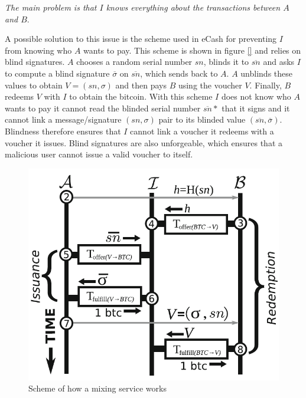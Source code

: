\emph{The main problem is that $I$ knows everything about the transactions between
$A$ and $B$}.

A possible solution to this issue is the scheme used in eCash for preventing $I$
from knowing who $A$ wants to pay. This scheme is shown in figure \ref{} and
relies on blind signatures. $A$ chooses a random serial number $sn$, blinds it
to $\overline{sn}$ and asks $I$ to compute a blind signature $\overline\sigma$
on $\overline{sn}$, which sends back to $A$. $A$ unblinds these values to obtain
$V = (sn, \sigma)$ and then pays $B$ using the voucher $V$. Finally, $B$ redeems
$V$ with $I$ to obtain the bitcoin. With this scheme $I$ does not know who $A$
wants to pay it cannot read the blinded serial number $\overline{sn}*$ that it
signs and it cannot link a message/signature $(sn, \sigma)$ pair to its blinded
value $(\overline{sn}, \overline\sigma)$. Blindness therefore ensures that $I$
cannot link a voucher it redeems with a voucher it issues. Blind signatures are
also unforgeable, which ensures that a malicious user cannot issue a valid
voucher to itself.

\begin{figure}[!htb]
	\centering
	\includegraphics[width=0.6\linewidth]{img/ecash-scheme.png}
	\caption{Scheme of how a mixing service works}
	\label{fig:mixing-service-scheme}
\end{figure}
